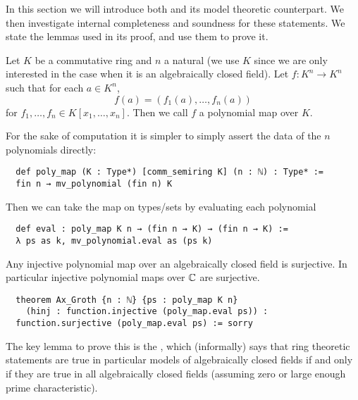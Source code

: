 In this section we will introduce both  and
its model theoretic counterpart.
We then investigate internal completeness and soundness for these statements.
We state the lemmas used in its proof, and use them to prove it.

\begin{dfn}
  Let $K$ be a commutative ring and $n$ a natural
  (we use $K$ since we are only interested in the case
  when it is an algebraically closed field).
  Let $f : K^n \to K^n$ such that for each $a \in K^n$,
  \[f(a) = (f_1(a), \dots, f_n(a))\] for
  $f_1, \dots, f_n \in K[x_1, \dots, x_n]$.
  Then we call $f$ a polynomial map over $K$.

  For the sake of computation it is simpler to simply assert
  the data of the $n$ polynomials directly:

  \begin{lstlisting}
  def poly_map (K : Type*) [comm_semiring K] (n : ℕ) : Type* :=
  fin n → mv_polynomial (fin n) K \end{lstlisting}

  Then we can take the map on types/sets by evaluating each polynomial
  \begin{lstlisting}
  def eval : poly_map K n → (fin n → K) → (fin n → K) :=
  λ ps as k, mv_polynomial.eval as (ps k) \end{lstlisting}
\end{dfn}

\begin{prop}[Ax-Grothendieck]
    Any injective polynomial map over an algebraically closed field is surjective.
    In particular injective polynomial maps over $\mathbb{C}$ are surjective.

\begin{lstlisting}
  theorem Ax_Groth {n : ℕ} {ps : poly_map K n}
    (hinj : function.injective (poly_map.eval ps)) :
  function.surjective (poly_map.eval ps) := sorry \end{lstlisting}
\end{prop}

The key lemma to prove this is the ,
which (informally) says that ring theoretic statements are true in particular models
of algebraically closed fields if and only if they are true in all algebraically closed fields
(assuming zero or large enough prime characteristic).

